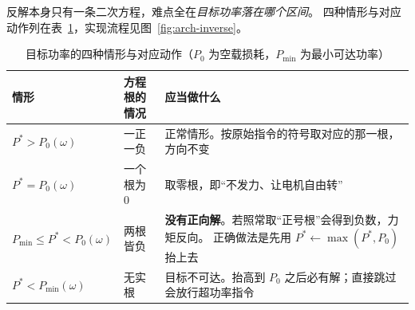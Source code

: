 \documentclass[cn,blue,11pt,device=normal]{elegantnote}
\begin{document}
反解本身只有一条二次方程，难点全在\emph{目标功率落在哪个区间}。
四种情形与对应动作列在表~\ref{tab:arch-fourcases}，实现流程见图~\ref{fig:arch-inverse}。

\begin{table}[htbp]
  \centering
  \small
  \caption{目标功率的四种情形与对应动作（$P_0$ 为空载损耗，$P_{\min}$ 为最小可达功率）}
  \label{tab:arch-fourcases}
  \begin{tabular}{@{}>{\raggedright\arraybackslash}p{}>{\raggedright\arraybackslash}p{}>{\raggedright\arraybackslash}p{}@{}}
    \toprule
    情形 & 方程根的情况 & 应当做什么 \\
    \midrule
    $P^{\ast} > P_0(\omega)$ & 一正一负 &
    正常情形。按原始指令的符号取对应的那一根，方向不变 \\[4pt]
    $P^{\ast} = P_0(\omega)$ & 一个根为 $0$ &
    取零根，即“不发力、让电机自由转” \\[4pt]
    $P_{\min} \le P^{\ast} < P_0(\omega)$ & 两根皆负 &
    \textbf{没有正向解}。若照常取“正号根”会得到负数，力矩反向。
    正确做法是先用 $P^{\ast}\gets\max(P^{\ast},P_0)$ 抬上去 \\[4pt]
    $P^{\ast} < P_{\min}(\omega)$ & 无实根 &
    目标不可达。抬高到 $P_0$ 之后必有解；直接跳过会放行超功率指令 \\
    \bottomrule
  \end{tabular}
\end{table}
\end{document}
